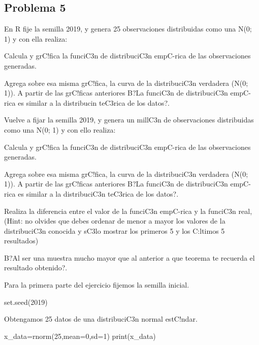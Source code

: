 \documentclass[
]{article}
\newenvironment{Shaded}{\begin{snugshade}}{\end{snugshade}}
\newcommand{\AttributeTok}[1]{\textcolor[rgb]{0.77,0.63,0.00}{#1}}
\newcommand{\DecValTok}[1]{\textcolor[rgb]{0.00,0.00,0.81}{#1}}
\newcommand{\FunctionTok}[1]{\textcolor[rgb]{0.00,0.00,0.00}{#1}}
\newcommand{\NormalTok}[1]{#1}
\newcommand{\OtherTok}[1]{\textcolor[rgb]{0.56,0.35,0.01}{#1}}
\begin{document}
\hypertarget{problema-5}{%
\subsection{Problema 5}\label{problema-5}}

En R fije la semilla 2019, y genera 25 observaciones distribuidas como
una N(0; 1) y con ella realiza:

Calcula y grC!fica la funciC3n de distribuciC3n empC-rica de las
observaciones generadas.

Agrega sobre esa misma grC!fica, la curva de la distribuciC3n verdadera
(N(0; 1)). A partir de las grC!ficas anteriores B?La funciC3n de
distribuciC3n empC-rica es similar a la distribucin teC3rica de los
datos?.

Vuelve a fijar la semilla 2019, y genera un millC3n de observaciones
distribuidas como una N(0; 1) y con ello realiza:

Calcula y grC!fica la funciC3n de distribuciC3n empC-rica de las
observaciones generadas.

Agrega sobre esa misma grC!fica, la curva de la distribuciC3n verdadera
(N(0; 1)). A partir de las grC!ficas anteriores B?La funciC3n de
distribuciC3n empC-rica es similar a la distribuciC3n teC3rica de los
datos?.

Realiza la diferencia entre el valor de la funciC3n empC-rica y la
funciC3n real, (Hint: no olvides que debes ordenar de menor a mayor los
valores de la distribuciC3n conocida y sC3lo mostrar los primeros 5 y
los C:ltimos 5 resultados)

B?Al ser una muestra mucho mayor que al anterior a que teorema te
recuerda el resultado obtenido?.

Para la primera parte del ejercicio fijemos la semilla inicial.

\begin{Shaded}
\begin{Highlighting}[]
\FunctionTok{set.seed}\NormalTok{(}\DecValTok{2019}\NormalTok{)}
\end{Highlighting}
\end{Shaded}

Obtengamos 25 datos de una distribuciC3n normal estC!ndar.

\begin{Shaded}
\begin{Highlighting}[]
\NormalTok{x\_data}\OtherTok{=}\FunctionTok{rnorm}\NormalTok{(}\DecValTok{25}\NormalTok{,}\AttributeTok{mean=}\DecValTok{0}\NormalTok{,}\AttributeTok{sd=}\DecValTok{1}\NormalTok{)}
\FunctionTok{print}\NormalTok{(x\_data)}
\end{Highlighting}
\end{Shaded}
\end{document}

